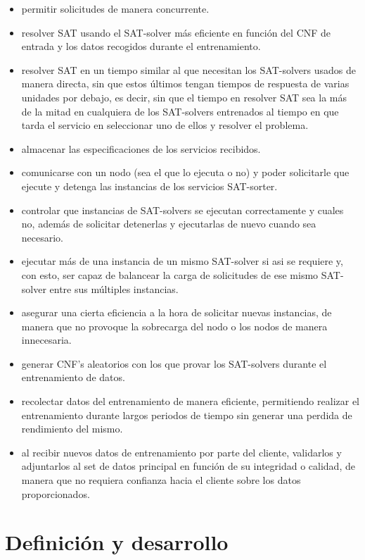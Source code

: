 \documentclass[11pt]{article}
\begin{document}
			\begin{itemize}
				\item permitir solicitudes de manera concurrente.
				\item resolver SAT usando el SAT-solver más eficiente en función del CNF de entrada y los datos recogidos durante el entrenamiento.
				\item resolver SAT en un tiempo similar al que necesitan los SAT-solvers usados de manera directa, sin que estos últimos tengan tiempos de respuesta
					de varias unidades por debajo, es decir, sin que el tiempo en resolver SAT sea la más de la mitad en cualquiera de los SAT-solvers entrenados al tiempo
					en que tarda el servicio en seleccionar uno de ellos y resolver el problema.
				\item almacenar las especificaciones de los servicios recibidos.
				\item comunicarse con un nodo (sea el que lo ejecuta o no) y poder solicitarle que ejecute y detenga las instancias de 
					los servicios SAT-sorter.
				\item controlar que instancias de SAT-solvers se ejecutan correctamente y cuales no, además de solicitar detenerlas y ejecutarlas 
					de nuevo cuando sea necesario.
				\item ejecutar más de una instancia de un mismo SAT-solver si asi se requiere y, con esto, ser capaz de balancear la carga de solicitudes
					de ese mismo SAT-solver entre sus múltiples instancias.
				\item asegurar una cierta eficiencia a la hora de solicitar nuevas instancias, de manera que no provoque la sobrecarga del nodo o los nodos
					de manera innecesaria.
				\item generar CNF's aleatorios con los que provar los SAT-solvers durante el entrenamiento de datos.
				\item recolectar datos del entrenamiento de manera eficiente, permitiendo realizar el entrenamiento durante largos periodos de tiempo sin generar
					una perdida de rendimiento del mismo.
				\item al recibir nuevos datos de entrenamiento por parte del cliente, validarlos y  adjuntarlos al set de datos principal en función de su integridad
					o calidad, de manera que no requiera confianza hacia el cliente sobre los datos proporcionados.
			\end{itemize}

	\section{Definición y desarrollo}
\end{document}
